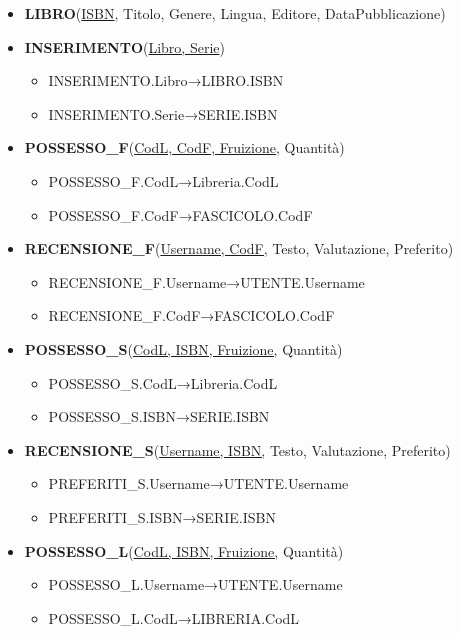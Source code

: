 \documentclass{article}
\begin{document}
\begin{itemize}
    \item \textbf{LIBRO}(\underline{ISBN}, Titolo, Genere, Lingua, Editore,  DataPubblicazione)
    \item \textbf{INSERIMENTO}(\underline{Libro, Serie})
        \begin{itemize}
	       \item INSERIMENTO.Libro→LIBRO.ISBN
	       \item INSERIMENTO.Serie→SERIE.ISBN
        \end{itemize}
    \item \textbf{POSSESSO\_F}(\underline{CodL, CodF, Fruizione,} Quantità)
        \begin{itemize}    
            \item POSSESSO\_F.CodL→Libreria.CodL
            \item POSSESSO\_F.CodF→FASCICOLO.CodF
        \end{itemize}
    \item \textbf{RECENSIONE\_F}(\underline{Username, CodF,} Testo, Valutazione, Preferito)
        \begin{itemize}  
            \item RECENSIONE\_F.Username→UTENTE.Username
            \item RECENSIONE\_F.CodF→FASCICOLO.CodF
        \end{itemize}
    \item \textbf{POSSESSO\_S}(\underline{CodL, ISBN, Fruizione,} Quantità)
        \begin{itemize}
            \item POSSESSO\_S.CodL→Libreria.CodL
            \item POSSESSO\_S.ISBN→SERIE.ISBN
        \end{itemize}
    \item \textbf{RECENSIONE\_S}(\underline{Username, ISBN,} Testo, Valutazione, Preferito)
        \begin{itemize}
            \item PREFERITI\_S.Username→UTENTE.Username
            \item PREFERITI\_S.ISBN→SERIE.ISBN
        \end{itemize}
    \item \textbf{POSSESSO\_L}(\underline{CodL, ISBN, Fruizione,} Quantità)
        \begin{itemize}
            \item POSSESSO\_L.Username→UTENTE.Username
            \item POSSESSO\_L.CodL→LIBRERIA.CodL

\end{itemize}
\end{itemize}
\end{document}
